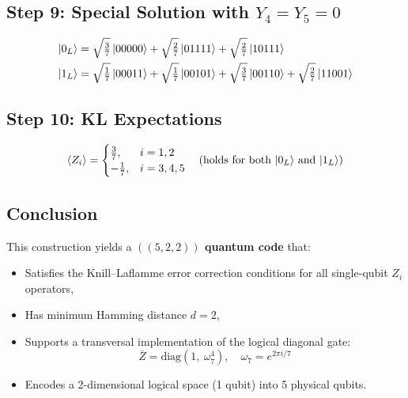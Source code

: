 \documentclass{article}
\begin{document}
\subsection*{Step 9: Special Solution with \( Y_4 = Y_5 = 0 \)}

\[
\begin{aligned}
\ket{0_L} &= \sqrt{\tfrac{3}{7}} \ket{00000} + \sqrt{\tfrac{2}{7}} \ket{01111} + \sqrt{\tfrac{2}{7}} \ket{10111} \\
\ket{1_L} &= \sqrt{\tfrac{1}{7}} \ket{00011} + \sqrt{\tfrac{1}{7}} \ket{00101} + \sqrt{\tfrac{3}{7}} \ket{00110} + \sqrt{\tfrac{2}{7}} \ket{11001}
\end{aligned}
\]

\subsection*{Step 10: KL Expectations}

\[
\langle Z_i \rangle =
\begin{cases}
\frac{3}{7}, & i = 1,2 \\
-\frac{1}{7}, & i = 3,4,5
\end{cases}
\quad \text{(holds for both \( \ket{0_L} \) and \( \ket{1_L} \))}
\]

\subsection*{Conclusion}

This construction yields a \textbf{\(((5,2,2))\) quantum code} that:
\begin{itemize}
  \item Satisfies the Knill–Laflamme error correction conditions for all single-qubit \(Z_i\) operators,
  \item Has minimum Hamming distance \(d = 2\),
  \item Supports a transversal implementation of the logical diagonal gate:
  \[
  \overline{Z} = \mathrm{diag}(1,\ \omega_7^4), \quad \omega_7 = e^{2\pi i/7}
  \]
  \item Encodes a 2-dimensional logical space (1 qubit) into 5 physical qubits.
\end{itemize}
\end{document}
